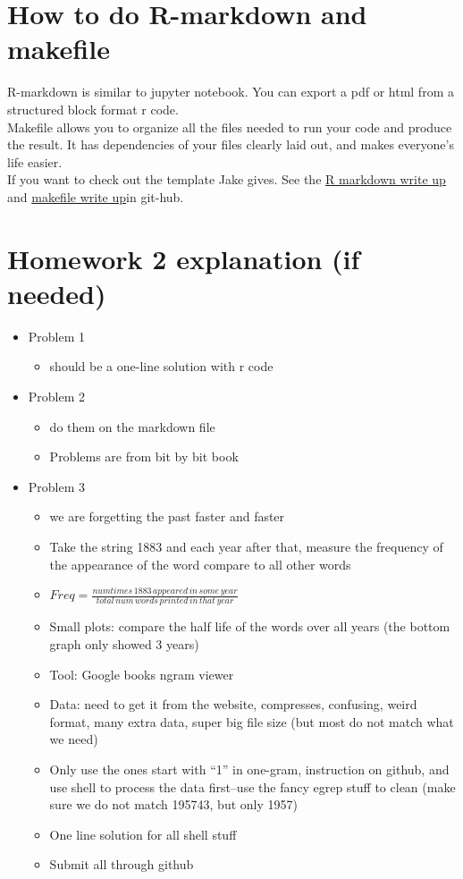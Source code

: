 \section{How to do R-markdown and makefile}

R-markdown is similar to jupyter notebook. You can export a pdf or html from a structured block format r code.\\
Makefile allows you to organize all the files needed to run your code and produce the result. It has dependencies of your files clearly laid out, and makes everyone's life easier.\\
If you want to check out the template Jake gives. See the \href{https://github.com/jhofman/msd2019/blob/master/lectures/lecture_6/writeup.Rmd}{R markdown write up} and \href{https://github.com/jhofman/msd2019/blob/master/lectures/lecture_6/Makefile}{makefile write up}in git-hub.


\section{Homework 2 explanation (if needed)}

\begin{itemize}
  \item Problem 1
  \begin{itemize}
      \item should be a one-line solution with r code
  \end{itemize}
  \item Problem 2
  \begin{itemize}
      \item do them on the markdown file
      \item Problems are from bit by bit book
  \end{itemize}
  \item Problem 3 
  \begin{itemize}
      \item we are forgetting the past faster and faster
      \item Take the string 1883 and each year after that, measure the frequency of the appearance of the word compare to all other words
      \item $Freq =  \frac{num times\, 1883\, appeared\, in\, some\, year}{total \,num\, words\, printed\, in\, that\, year}$
      \item Small plots: compare the half life of the words over all years (the bottom graph only showed 3 years)
      \item Tool: Google books ngram viewer
      \item Data: need to get it from the website, compresses, confusing, weird format, many extra data, super big file size (but most do not match what we need)
      \item Only use the ones start with “1” in one-gram, instruction on github, and use shell to process the data first--use the fancy egrep stuff to clean (make sure we do not match 195743, but only 1957)
      \item One line solution for all shell stuff 
      \item Submit all through github
  \end{itemize}
\end{itemize}
